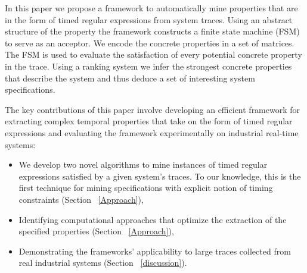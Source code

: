 \documentclass[]{sigplanconf}
\begin{document}
In this paper we propose a framework to automatically mine properties that are in the form of timed regular expressions from system traces. Using an abstract structure of the property the framework constructs a finite state machine (FSM) to serve as an acceptor. We encode the concrete properties in a set of matrices. The FSM is used to evaluate the satisfaction of every potential concrete property in the trace. Using a ranking system we infer the strongest concrete properties that describe the system and thus deduce a set of interesting system specifications.

The key contributions of this paper involve developing an efficient framework for extracting complex temporal properties that take on the form of timed regular expressions and evaluating the framework experimentally on industrial real-time systems:

\begin{itemize}
\item We develop two novel algorithms to mine instances of timed regular expressions satisfied by a given system's traces. To our knowledge, this is the first technique for mining specifications with explicit notion of timing constraints (Section ~\ref{Approach}),
\item Identifying computational approaches that optimize the extraction of the specified properties (Section ~\ref{Approach}),
\item Demonstrating the frameworks' applicability to large traces collected from real industrial systems  (Section ~\ref{discussion}).
\end{itemize}




\end{document}

